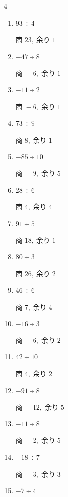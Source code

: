 \begin{multicols}{4}
\begin{enumerate}
        $商\; 8,\; 余り\; 9$

  \item $93 \div 4$

        $商\; 23,\; 余り\; 1$

  \item $-47 \div 8$

        $商\; -6,\; 余り\; 1$

  \item $-11 \div 2$

        $商\; -6,\; 余り\; 1$

  \item $73 \div 9$

        $商\; 8,\; 余り\; 1$

  \item $-85 \div 10$

        $商\; -9,\; 余り\; 5$

  \item $28 \div 6$

        $商\; 4,\; 余り\; 4$

  \item $91 \div 5$

        $商\; 18,\; 余り\; 1$

  \item $80 \div 3$

        $商\; 26,\; 余り\; 2$

  \item $46 \div 6$

        $商\; 7,\; 余り\; 4$

  \item $-16 \div 3$

        $商\; -6,\; 余り\; 2$

  \item $42 \div 10$

        $商\; 4,\; 余り\; 2$

  \item $-91 \div 8$

        $商\; -12,\; 余り\; 5$

  \item $-11 \div 8$

        $商\; -2,\; 余り\; 5$

\columnbreak %

  \item $-18 \div 7$

        $商\; -3,\; 余り\; 3$

  \item $-7 \div 4$


\end{enumerate}
\end{multicols}
